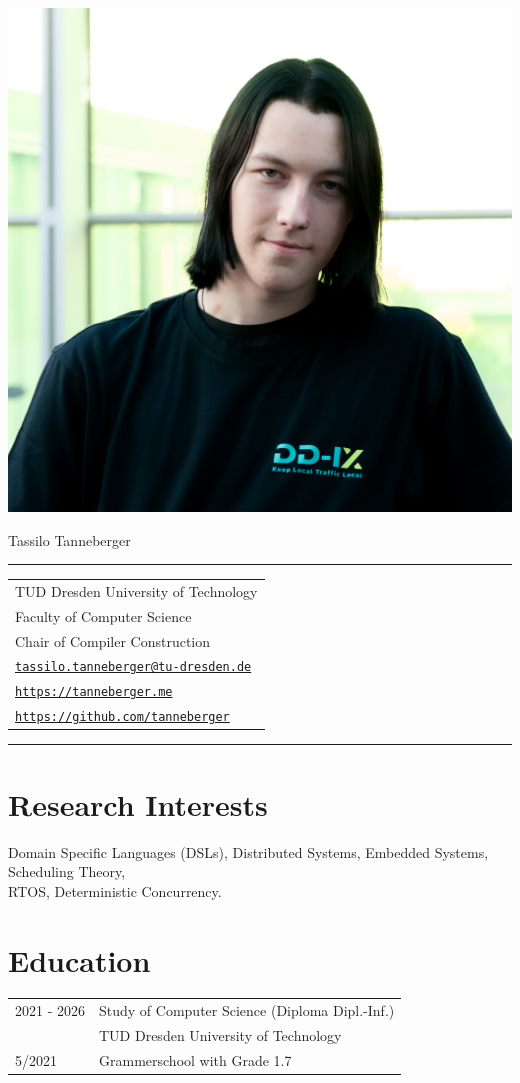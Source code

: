 \documentclass[11pt, a4paper, oneside]{article}
\begin{document}
\includegraphics[width=0.3\linewidth, right]{Tassilo} 
\vspace*{-16em}
\begin{flushleft}
\hspace*{1.3em} \huge Tassilo Tanneberger
\vspace*{-0.5em}
\par\noindent\rule{0.6\textwidth}{0.4pt}
\end{flushleft}

\vspace*{-0.4em}

\begin{tabular}{l}
TUD Dresden University of Technology  \\
Faculty of Computer Science \\ 
Chair of Compiler Construction \\ 
\href{mailto: tassilo.tanneberger@tu-dresden.de}{\texttt{tassilo.tanneberger@tu-dresden.de}} \\
\href{https://tanneberger.me}{\texttt{https://tanneberger.me}} \\
\href{https://github.com/tanneberger}{\texttt{https://github.com/tanneberger}}
\end{tabular}

\par\noindent\rule{0.6\textwidth}{0.4pt}

\section*{Research Interests}

Domain Specific Languages (DSLs), Distributed Systems, Embedded Systems, Scheduling Theory, \\ RTOS,  Deterministic Concurrency.  

\section*{Education}

\begin{tabular}{ R{3cm} L{10cm}}
	2021 - 2026 &  Study of Computer Science (Diploma Dipl.-Inf.) \\
							& TUD Dresden University of Technology \\ 
	5/2021			& Grammerschool with Grade 1.7
\end{tabular}
\end{document}
